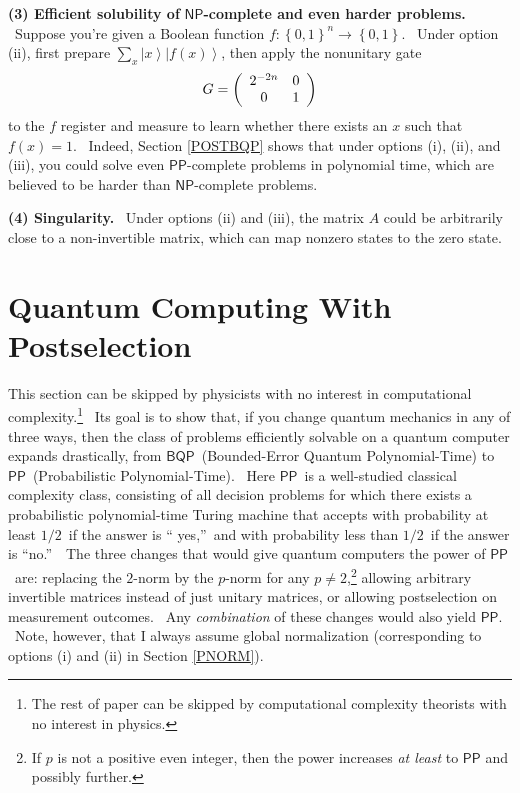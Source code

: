 \documentclass{article}%
\begin{document}
\textbf{(3) Efficient solubility of }$\mathsf{NP}$\textbf{-complete and even
harder problems.} \ Suppose you're given a Boolean function $f:\left\{
0,1\right\}  ^{n}\rightarrow\left\{  0,1\right\}  $. \ Under option (ii),
first prepare $\sum_{x}\left\vert x\right\rangle \left\vert f\left(  x\right)
\right\rangle $, then apply the nonunitary gate%
\begin{equation}
G=\left(
\begin{array}
[c]{cc}%
2^{-2n} & 0\\
0 & 1
\end{array}
\right)  \label{gateg}%
\end{equation}
to the $f$ register and measure to learn whether there exists an $x$ such that
$f\left(  x\right)  =1$. \ Indeed, Section \ref{POSTBQP} shows that under
options (i), (ii), and (iii), you could solve even $\mathsf{PP}$-complete
problems in polynomial time, which are believed to be harder than
$\mathsf{NP}$-complete problems.

\textbf{(4) Singularity.} \ Under options (ii) and (iii), the matrix $A$ could
be arbitrarily close to a non-invertible matrix, which can map nonzero states
to the zero state.

\section{Quantum Computing With Postselection\label{POSTBQP}}

This section can be skipped by physicists with no interest in computational
complexity.\footnote{The rest of paper can be skipped by computational
complexity theorists with no interest in physics.} \ Its goal is to show that,
if you change quantum mechanics in any of three ways, then the class of
problems efficiently solvable on a quantum computer expands drastically, from
$\mathsf{BQP}$\ (Bounded-Error Quantum Polynomial-Time) to $\mathsf{PP}%
$\ (Probabilistic Polynomial-Time). \ Here $\mathsf{PP}$\ is a well-studied
classical complexity class, consisting of all decision problems for which
there exists a probabilistic polynomial-time Turing machine that accepts with
probability at least $1/2$\ if the answer is \textquotedblleft
yes,\textquotedblright\ and with probability less than $1/2$\ if the answer is
\textquotedblleft no.\textquotedblright\ \ The three changes that would give
quantum computers the power of $\mathsf{PP}$\ are: replacing the $2$-norm by
the $p$-norm for any $p\neq2$,\footnote{If $p$ is not a positive even integer,
then the power increases \textit{at least} to $\mathsf{PP}$ and possibly
further.} allowing arbitrary invertible matrices instead of just unitary
matrices, or allowing postselection on measurement outcomes. \ Any
\textit{combination} of these changes would also yield $\mathsf{PP}$. \ Note,
however, that I always assume global normalization (corresponding to options
(i) and (ii) in Section \ref{PNORM}).
\end{document}
